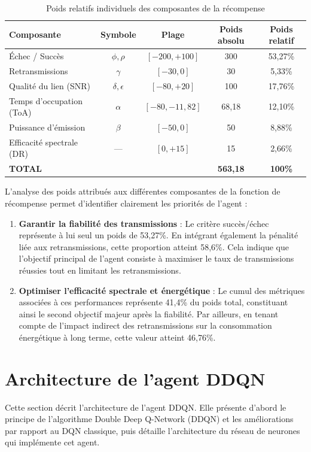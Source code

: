 \begin{table}[H]
	\centering
	\caption{Poids relatifs individuels des composantes de la récompense}
	\label{tab:poids-individuels}
	\begin{tabular}{|l|c|c|c|c|}
		\hline
		\textbf{Composante} & \textbf{Symbole} & \textbf{Plage} & \textbf{Poids absolu} & \textbf{Poids relatif} \\
		\hline
		Échec / Succès & $\phi, \rho$ & $[-200, +100]$ & 300 & 53,27\% \\
		\hline
		Retransmissions & $\gamma$ & $[-30, 0]$ & 30 & 5,33\% \\
		\hline
		Qualité du lien (SNR) & $\delta, \epsilon$ & $[-80, +20]$ & 100 & 17,76\% \\
		\hline
		Temps d'occupation (ToA) & $\alpha$ & $[-80, -11,82]$ & 68,18 & 12,10\% \\
		\hline
		Puissance d'émission & $\beta$ & $[-50, 0]$ & 50 & 8,88\% \\
		\hline
		Efficacité spectrale (DR) & — & $[0, +15]$ & 15 & 2,66\% \\
		\hline
		\textbf{TOTAL} & & & \textbf{563,18} & \textbf{100\%} \\
		\hline
	\end{tabular}
\end{table}

L’analyse des poids attribués aux différentes composantes de la fonction de récompense permet d’identifier clairement les priorités de l’agent :

\begin{enumerate}
	\item \textbf{Garantir la fiabilité des transmissions} :
	Le critère succès/échec représente à lui seul un poids de 53,27\%. En intégrant également la pénalité liée aux retransmissions, cette proportion atteint 58,6\%. Cela indique que l’objectif principal de l’agent consiste à maximiser le taux de transmissions réussies tout en limitant les retransmissions.
	
	\item \textbf{Optimiser l’efficacité spectrale et énergétique} :
	Le cumul des métriques associées à ces performances représente 41,4\% du poids total, constituant ainsi le second objectif majeur après la fiabilité. Par ailleurs, en tenant compte de l’impact indirect des retransmissions sur la consommation énergétique à long terme, cette valeur atteint 46,76\%.
\end{enumerate}


\section{Architecture de l'agent DDQN}
\label{sec:architecture-agent-ddqn}
Cette section décrit l’architecture de l’agent DDQN. Elle présente d’abord le principe de l’algorithme Double Deep Q-Network (DDQN) et les améliorations par rapport au DQN classique, puis détaille l’architecture du réseau de neurones qui implémente cet agent.

